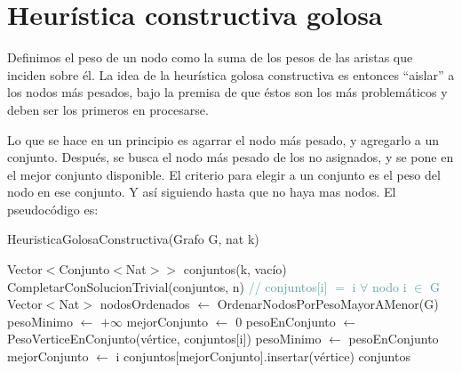 \section{Heurística constructiva golosa}

Definimos el peso de un nodo como la suma de los pesos de las aristas que inciden sobre él. La idea de la heurística golosa constructiva es entonces ``aislar'' a los nodos más pesados, bajo la premisa de que éstos son los más problemáticos y deben ser los primeros en procesarse.

Lo que se hace en un principio es agarrar el nodo más pesado, y agregarlo a un conjunto. Después, se busca el nodo más pesado de los no asignados, y se pone en el mejor conjunto disponible. El criterio para elegir a un conjunto es el peso del nodo en ese conjunto. Y así siguiendo hasta que no haya mas nodos. El pseudocódigo es:
\begin{algorithm}[H]
\begin{algorithmic}[1]
\caption{HeuristicaGolosaConstructiva(Grafo G, nat k)}
\STATE Vector$<$Conjunto$<$Nat$>>$ conjuntos(k, vacío)
    \STATE CompletarConSolucionTrivial(conjuntos, n) \textcolor{CadetBlue}{// conjuntos$[$i$]$ $=$ i $\forall$ nodo i $\in$ G}
\ELSE
    \STATE Vector$<$Nat$>$ nodosOrdenados $\leftarrow$ OrdenarNodosPorPesoMayorAMenor(G)
        \STATE pesoMinimo $\leftarrow$ $+ \infty$
        \STATE mejorConjunto $\leftarrow$ 0
            \STATE pesoEnConjunto $\leftarrow$ PesoVerticeEnConjunto(vértice, conjuntos$[$i$]$)
                \STATE pesoMinimo $\leftarrow$ pesoEnConjunto
                \STATE mejorConjunto $\leftarrow$ i
            \ENDIF
        \ENDFOR
        \STATE conjuntos$[$mejorConjunto$]$.insertar(vértice)
    \ENDFOR
\ENDIF
\RETURN conjuntos
\end{algorithmic}
\end{algorithm}

